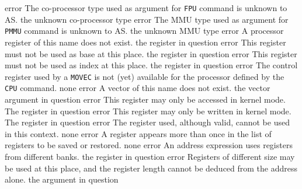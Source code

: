 \documentclass[12pt,twoside]{report}
\newcommand{\tty}[1]{{\tt #1}}
\newcommand{\asname}{{AS}}
\begin{document}
\begin{description}
               {error}
               {The co-processor type used as argument for \tty{FPU} command is
                unknown to \asname{}.}
               {the unknown co-processor type}
               {error}
               {The MMU type used as argument for \tty{PMMU} command is
                unknown to \asname{}.}
               {the unknown MMU type}
               {error}
               {A processor register of this name does not exist.}
               {the register in question}
               {error}
               {This register must not be used as base at this place.}
               {the register in question}
               {error}
               {This register must not be used as index at this place.}
               {the register in question}
               {error}
               {The control register used by a \tty{MOVEC} is not (yet) available
                for the processor defined by the \tty{CPU} command.}
               {none}
               {error}
               {A vector of this name does not exist.}
               {the vector argument in question}
               {error}
               {This register may only be accessed in kernel mode.}
               {The register in question}
               {error}
               {This register may only be written in kernel mode.}
               {The register in question}
               {error}
               {The register used, although valid, cannot be used in this
                context.}
               {none}
               {error}
               {A register appears more than once in the list of registers
                to be saved or restored.}
               {none}
               {error}
               {An address expression uses registers from different banks.}
               {the register in question}
               {error}
               {Registers of different size may be used at this place, and
                 the register length cannot be deduced from the address alone.}
               {the argument in question}

\end{description}
\end{document}
